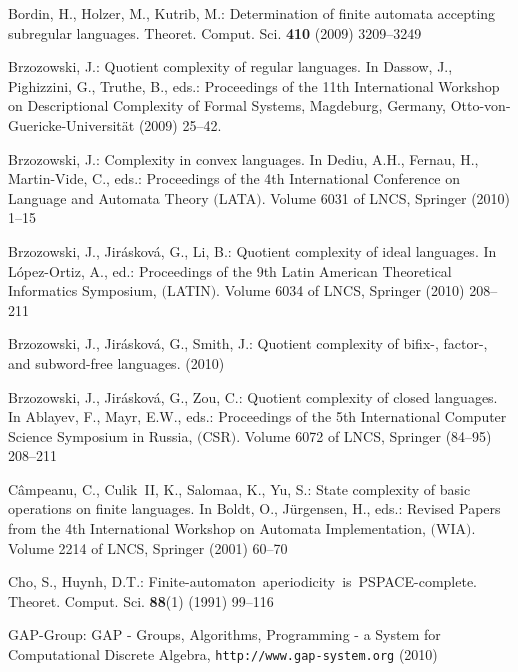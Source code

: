 \documentclass{llncs}
\begin{document}
\providecommand{\noopsort}[1]{}
\begin{thebibliography}{10}

Bordin, H., Holzer, M., Kutrib, M.:
\newblock Determination of finite automata accepting subregular languages.
\newblock Theoret. Comput. Sci. \textbf{410} (2009)  3209--3249

Brzozowski, J.:
\newblock Quotient complexity of regular languages.
\newblock In Dassow, J., Pighizzini, G., Truthe, B., eds.: Proceedings of the
  11th International Workshop on Descriptional Complexity of Formal Systems,
  Magdeburg, Germany, Otto-von-Guericke-Universit{\"a}t (2009)  25--42.

Brzozowski, J.:
\newblock Complexity in convex languages.
\newblock In Dediu, A.H., Fernau, H., Martin-Vide, C., eds.: Proceedings of the
  4th International Conference on Language and Automata Theory $($LATA\/$)$.
  Volume 6031 of LNCS, Springer (2010)  1--15

Brzozowski, J., Jir{\'a}skov{\'a}, G., Li, B.:
\newblock Quotient complexity of ideal languages.
\newblock In L\'opez-Ortiz, A., ed.: Proceedings of the 9th Latin American
  Theoretical Informatics Symposium, $($LATIN\/$)$. Volume 6034 of LNCS,
  Springer (2010)  208--211

Brzozowski, J., Jir\'askov\'a, G., Smith, J.:
\newblock Quotient complexity of bifix-, factor-, and subword-free languages.
 (2010)

Brzozowski, J., Jir{\'a}skov{\'a}, G., Zou, C.:
\newblock Quotient complexity of closed languages.
\newblock In Ablayev, F., Mayr, E.W., eds.: Proceedings of the 5th
  International Computer Science Symposium in Russia, $($CSR\/$)$. Volume 6072
  of LNCS, Springer (84--95)  208--211

C\^ampeanu, C., Culik~II, K., Salomaa, K., Yu, S.:
\newblock State complexity of basic operations on finite languages.
\newblock In Boldt, O., J{\"u}rgensen, H., eds.: Revised Papers from the 4th
  International Workshop on Automata Implementation, $($WIA\/$)$. Volume 2214
  of LNCS, Springer (2001)  60--70

Cho, S., Huynh, D.T.:
\newblock \mbox{Finite-automaton aperiodicity is PSPACE-complete}.
\newblock Theoret. Comput. Sci. \textbf{88}(1) (1991)  99--116

GAP-Group:
\newblock GAP - Groups, Algorithms, Programming - a System for Computational
  Discrete Algebra, {\tt http://www.gap-system.org} (2010)


\end{thebibliography}
\end{document}
